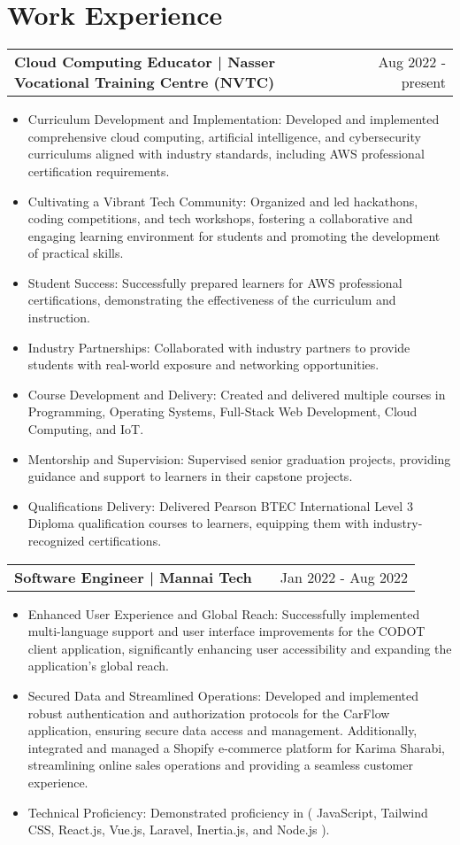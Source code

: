 \documentclass[a4paper,11pt]{article}
\makeatletter
\newenvironment{joblong}[2]
    {
    \begin{tabularx}{\linewidth}{@{}l X r@{}}
    \textbf{#1} & \hfill &  #2 \\[3.75pt]
    \end{tabularx}
    \begin{minipage}[t]{\linewidth}
    \begin{itemize}[nosep,after=\strut, leftmargin=1em, itemsep=3pt,label=--]
    }
    {
    \end{itemize}
    \end{minipage}    
    }
\makeatother
\begin{document}
\section{Work Experience}

\begin{joblong}{Cloud Computing Educator | Nasser Vocational Training Centre (NVTC)}{Aug 2022 - present}
\item Curriculum Development and Implementation: Developed and implemented comprehensive cloud computing, artificial intelligence, and cybersecurity curriculums aligned with industry standards, including AWS professional certification requirements.
\item Cultivating a Vibrant Tech Community: Organized and led hackathons, coding competitions, and tech workshops, fostering a collaborative and engaging learning environment for students and promoting the development of practical skills.
\item Student Success: Successfully prepared learners for AWS professional certifications, demonstrating the effectiveness of the curriculum and instruction.
\item Industry Partnerships: Collaborated with industry partners to provide students with real-world exposure and networking opportunities.
\item Course Development and Delivery: Created and delivered multiple courses in Programming, Operating Systems, Full-Stack Web Development, Cloud Computing, and IoT.
\item Mentorship and Supervision: Supervised senior graduation projects, providing guidance and support to learners in their capstone projects.
\item Qualifications Delivery: Delivered Pearson BTEC International Level 3 Diploma qualification courses to learners, equipping them with industry-recognized certifications.
\end{joblong}

\begin{joblong}{Software Engineer | Mannai Tech}{Jan 2022 - Aug 2022}
    \item Enhanced User Experience and Global Reach: Successfully implemented multi-language support and user interface improvements for the CODOT client application, significantly enhancing user accessibility and expanding the application's global reach.
    \item Secured Data and Streamlined Operations: Developed and implemented robust authentication and authorization protocols for the CarFlow application, ensuring secure data access and management. Additionally, integrated and managed a Shopify e-commerce platform for Karima Sharabi, streamlining online sales operations and providing a seamless customer experience.
    \item Technical Proficiency: Demonstrated proficiency in ( JavaScript, Tailwind CSS, React.js, Vue.js, Laravel, Inertia.js, and Node.js ).
    
\end{joblong}
\end{document}
